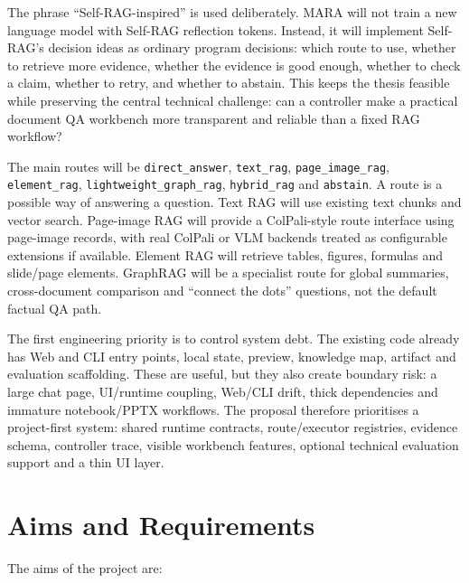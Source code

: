 \documentclass{article}
\begin{document}
The phrase ``Self-RAG-inspired'' is used deliberately. MARA will not train a new language model with Self-RAG reflection tokens. Instead, it will implement Self-RAG's decision ideas as ordinary program decisions: which route to use, whether to retrieve more evidence, whether the evidence is good enough, whether to check a claim, whether to retry, and whether to abstain. This keeps the thesis feasible while preserving the central technical challenge: can a controller make a practical document QA workbench more transparent and reliable than a fixed RAG workflow?

The main routes will be \texttt{direct\_answer}, \texttt{text\_rag}, \texttt{page\_image\_rag}, \texttt{element\_rag}, \texttt{lightweight\_graph\_rag}, \texttt{hybrid\_rag} and \texttt{abstain}. A route is a possible way of answering a question. Text RAG will use existing text chunks and vector search. Page-image RAG will provide a ColPali-style route interface using page-image records, with real ColPali or VLM backends treated as configurable extensions if available. Element RAG will retrieve tables, figures, formulas and slide/page elements. GraphRAG will be a specialist route for global summaries, cross-document comparison and ``connect the dots'' questions, not the default factual QA path.

The first engineering priority is to control system debt. The existing code already has Web and CLI entry points, local state, preview, knowledge map, artifact and evaluation scaffolding. These are useful, but they also create boundary risk: a large chat page, UI/runtime coupling, Web/CLI drift, thick dependencies and immature notebook/PPTX workflows. The proposal therefore prioritises a project-first system: shared runtime contracts, route/executor registries, evidence schema, controller trace, visible workbench features, optional technical evaluation support and a thin UI layer.

\section{Aims and Requirements}

The aims of the project are:
\end{document}
